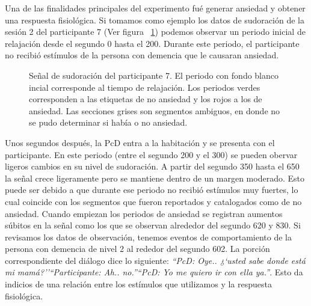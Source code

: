 Una de las finalidades principales del experimento fu\'e generar ansiedad y obtener una respuesta fisiol\'ogica. Si tomamos como ejemplo los datos de sudoraci\'on de la sesi\'on 2 del participante 7 (Ver figura ~\ref{fig:anxietyinduction}) podemos observar un periodo inicial de relajaci\'on desde el segundo 0 hasta el 200. Durante este periodo, el participante no recibi\'o est\'imulos de la persona con demencia que le causaran ansiedad.
\begin{figure}[h!]
        \centering
        \caption{Se\~nal de sudoraci\'on del participante 7. El periodo con fondo blanco incial corresponde al tiempo de relajaci\'on. Los periodos verdes corresponden a las etiquetas de no ansiedad y los rojos a los de ansiedad. Las secciones grises son segmentos ambiguos, en donde no se pudo determinar si hab\'ia o no ansiedad.}\label{fig:anxietyinduction}

\end{figure}

Unos segundos despu\'es, la PcD entra a la habitaci\'on y se presenta con el participante. En este periodo (entre el segundo 200 y el 300) se pueden obervar ligeros cambios en su nivel de sudoraci\'on. A partir del segundo 350 hasta el 650 la se\~nal crece ligeramente pero se mantiene dentro de un margen moderado. Esto puede ser debido a que durante ese periodo no recibi\'o est\'imulos muy fuertes, lo cual coincide con los segmentos que fueron reportados y catalogados como de no ansiedad. Cuando empiezan los periodos de ansiedad se registran aumentos s\'ubitos en la se\~nal como los que se observan alrededor del segundo 620 y 830. Si revisamos los datos de observaci\'on, tenemos eventos de comportamiento de la persona con demencia de nivel 2 al rededor del segundo 602. La porci\'on correspondiente del di\'alogo dice lo siguiente: \textit{``PcD: Oye.. ¿`usted sabe donde está mi mamá?''}\textit{``Participante: Ah.. no.''}\textit{``PcD: Yo me quiero ir con ella ya.''}. Esto da indicios de una relaci\'on entre los est\'imulos que utilizamos y la respuesta fisiol\'ogica.

